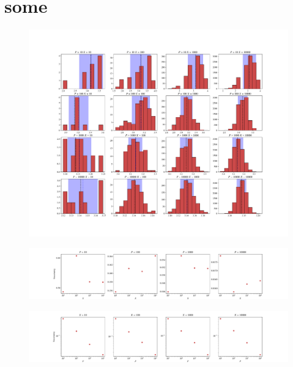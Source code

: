 \section{some}\label{sec:3}



\begin{figure}[htb]
    \centering
    \includegraphics[width=1\linewidth]{figs/ex1.5_px_combinations.pdf}
    \caption{}
    \label{}
\end{figure}

\begin{figure}[htb]
    \centering
    \includegraphics[width=\linewidth]{figs/1.5_uncertainty_function_of_x.pdf}
    \caption{}
    \label{}
\end{figure}

\begin{figure}[htb]
    \centering
    \includegraphics[width=\linewidth]{figs/1.5_uncertainty_function_of_p.pdf}
    \caption{}
    \label{}
\end{figure}